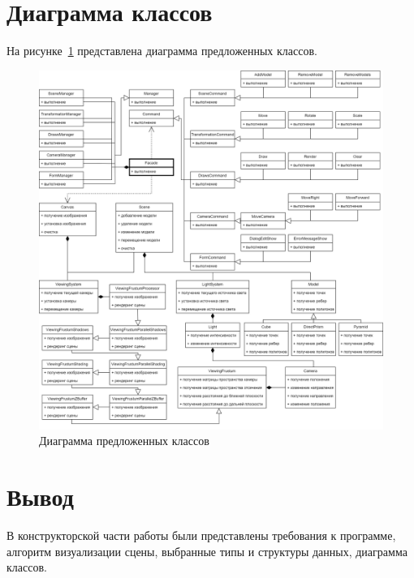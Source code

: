 \section{Диаграмма классов}

На рисунке~\ref{fig:class-diagram} представлена диаграмма предложенных классов.

\clearpage

\begin{figure}[h] 
	\centering
	\includegraphics[width=1\textwidth]{images/class-diagram.png}
	\caption{Диаграмма предложенных классов} 
	\label{fig:class-diagram} 
\end{figure}

\section{Вывод}

В конструкторской части работы были представлены требования к программе, алгоритм визуализации сцены, выбранные типы и структуры данных, диаграмма классов.

\clearpage
